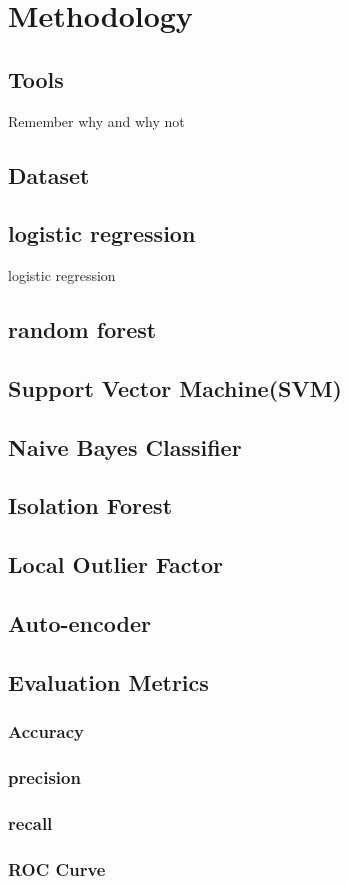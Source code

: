 \chapter{Methodology}

\section{Tools}
Remember why and why not
\section{Dataset}

\section{logistic regression}
logistic regression

\section{random forest}

\section{Support Vector Machine(SVM)}

\section{Naive Bayes Classifier}




\section{Isolation Forest}

\section{Local Outlier Factor}

\section{Auto-encoder}


\section{Evaluation Metrics}

\subsection{Accuracy}
\subsection{precision}
\subsection{recall}
\subsection{ROC Curve}